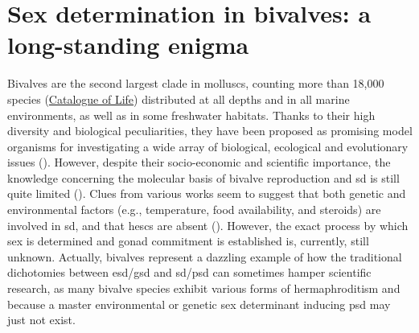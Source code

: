 \documentclass[../main.tex]{subfiles}
\begin{document}
\section{Sex determination in bivalves: a long-standing enigma}
Bivalves are the second largest clade in molluscs, counting more than 18,000 species (\href{https://www.catalogueoflife.org/}{Catalogue of Life}) distributed at all depths and in all marine environments, as well as in some freshwater habitats. Thanks to their high diversity and biological peculiarities, they have been proposed as promising model organisms for investigating a wide array of biological, ecological and evolutionary issues (\textbf{\cite{milani2020faraway,ghiselli2021bivalve}}). However, despite their socio-economic and scientific importance, the knowledge concerning the molecular basis of bivalve reproduction and \gls{sd} is still quite limited (\textbf{\cite{breton2018sex}}). Clues from various works seem to suggest that both genetic and environmental factors (e.g., temperature, food availability, and steroids) are involved in \gls{sd}, and that \glspl{hesc} are absent (\textbf{\cite{breton2018sex,han2022ancient}}). However, the exact process by which sex is determined and gonad commitment is established is, currently, still unknown. Actually, bivalves represent a dazzling example of how the traditional dichotomies between \gls{esd}/\gls{gsd} and \gls{sd}/\gls{psd} can sometimes hamper scientific research, as many bivalve species exhibit various forms of hermaphroditism and because a master environmental or genetic sex determinant inducing \gls{psd} may just not exist.
\end{document}
